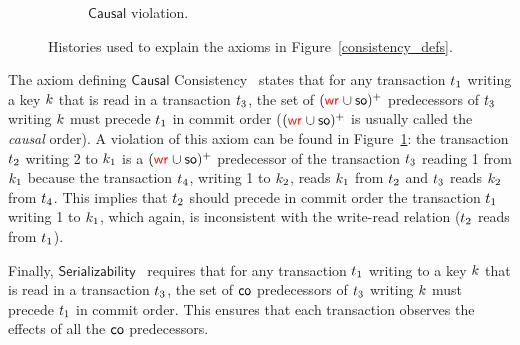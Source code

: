 \begin{figure}
\begin{subfigure}{.23\textwidth}
{  
}
 \caption{$\mathsf{Causal}$ violation.}
 \label{cc_example:1}
\end{subfigure}
\vspace{-3mm}
  \caption{Histories used to explain the axioms in Figure~\ref{consistency_defs}.}
  \label{counter_example:1}
\vspace{-3mm}
\end{figure}

The axiom defining $\mathsf{Causal}$ Consistency~\cite{DBLP:journals/cacm/Lamport78} states that for any transaction ${t}_1$ writing a key $k$ that is read in a transaction ${t}_3$, the set of $(\textcolor{red}{\mathsf{wr}_{}}\cup \mathsf{so})^+$ predecessors of ${t}_3$ writing $k$ must precede ${t}_1$ in commit order ($(\textcolor{red}{\mathsf{wr}_{}}\cup \mathsf{so})^+$ is usually called the \emph{causal} order). A violation of this axiom can be found in Figure~\ref{cc_example:1}: the transaction ${t}_2$ writing 2 to $k_1$ is a $(\textcolor{red}{\mathsf{wr}_{}}\cup \mathsf{so})^+$ predecessor of the transaction ${t}_3$ reading 1 from $k_1$ because the transaction ${t}_4$, writing 1 to $k_2$, reads $k_1$ from ${t}_2$ and ${t}_3$ reads $k_2$ from ${t}_4$. This implies that ${t}_2$ should precede in commit order the transaction ${t}_1$ writing 1 to $k_1$, which again, is inconsistent with the write-read relation (${t}_2$ reads from ${t}_1$).

Finally, $\mathsf{Serializability}$~\cite{DBLP:journals/jacm/Papadimitriou79b} requires that for any transaction ${t}_1$ writing to a key $k$ that is read in a transaction ${t}_3$, the set of $\mathsf{co}$ predecessors of ${t}_3$ writing $k$ must precede ${t}_1$ in commit order. This ensures that each transaction observes the effects of all the $\mathsf{co}$ predecessors. 


